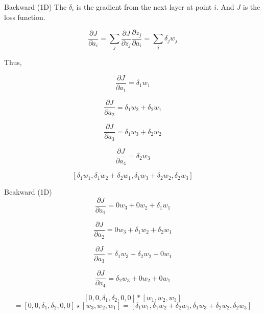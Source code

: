 \documentclass[aspectratio=1610,xcolor={dvipsnames},hyperref={colorlinks,unicode,linkcolor=violet,anchorcolor=BlueViolet,citecolor=YellowOrange,filecolor=black,urlcolor=Aquamarine}]{beamer}
\begin{document}
\begin{frame}[label={sec:org6df8e3c}]{Backward (1D)}
The \(\delta_{i}\) is the gradient from the next layer at point \(i\).  And \(J\) is the loss function.

\[\frac{\partial J}{\partial a_{i}} = \sum_{j} \frac{\partial J}{\partial z_{j}} \frac{\partial z_{j}}{\partial a_{i}} = \sum_{j} \delta_{j} w_{j}\]

Thus,

\[\frac{\partial J}{\partial a_{1}} = \delta_{1} w_{1}\]

\[ \frac{\partial J}{\partial a_{2}} = \delta_{1} w_{2} + \delta_{2} w_{1}\]

\[\frac{\partial J}{\partial a_{3}} = \delta_{1} w_{3} + \delta_{2} w_{2}\]

\[ \frac{\partial J}{\partial a_{4}} = \delta_{2} w_{3}\]

\[[\delta_{1}w_{1}, \delta_{1}w_{2} + \delta_{2}w_{1}, \delta_{1}w_{3} + \delta_{2}w_{2}, \delta_{2}w_{3}]\]
\end{frame}

\begin{frame}[label={sec:orgce3a3a3}]{Bcakward (1D)}
\[\frac{\partial J}{\partial a_{1}} = 0w_{3} + 0w_{2} + \delta_{1} w_{1}\]

\[ \frac{\partial J}{\partial a_{2}} = 0w_{3} + \delta_{1} w_{2} + \delta_{2} w_{1}\]

\[\frac{\partial J}{\partial a_{3}} = \delta_{1} w_{3} + \delta_{2} w_{2} + 0w_{1}\]

\[ \frac{\partial J}{\partial a_{4}} = \delta_{2} w_{3} + 0w_{2} + 0w_{1}\]

\[[0, 0, \delta_{1}, \delta_{2}, 0, 0] \ast [w_{1}, w_{2}, w_{3}]\]
\[= [0, 0, \delta_{1}, \delta_{2}, 0, 0] \star [w_{3}, w_{2}, w_{1}] = [\delta_{1}w_{1}, \delta_{1}w_{2} + \delta_{2}w_{1}, \delta_{1}w_{3} + \delta_{2}w_{2}, \delta_{2}w_{3}]\]
\end{frame}
\end{document}
